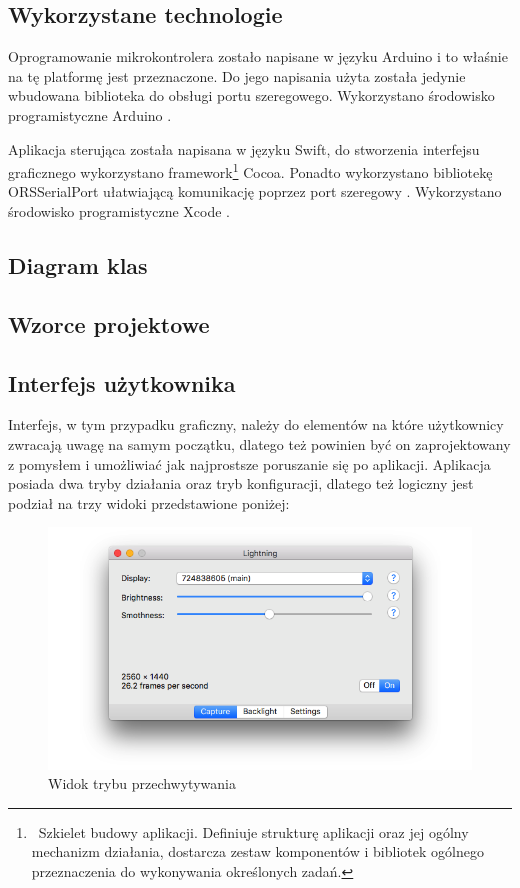 \documentclass[12pt]{report}
\begin{document}
\subsection{Wykorzystane technologie}

Oprogramowanie mikrokontrolera zostało napisane w języku Arduino i to właśnie na tę platformę jest przeznaczone. Do jego napisania użyta została jedynie wbudowana biblioteka do obsługi portu szeregowego. Wykorzystano środowisko programistyczne Arduino \cite{arduinoide}.

Aplikacja sterująca została napisana w języku Swift, do stworzenia interfejsu graficznego wykorzystano framework\footnote{~Szkielet budowy aplikacji. Definiuje strukturę aplikacji oraz jej ogólny mechanizm działania, dostarcza zestaw komponentów i bibliotek ogólnego przeznaczenia do wykonywania określonych zadań.} Cocoa. Ponadto wykorzystano bibliotekę\\ORSSerialPort ułatwiającą komunikację poprzez port szeregowy \cite{orsserialport}. Wykorzystano środowisko programistyczne Xcode \cite{xcode}.

\subsection{Diagram klas}


\subsection{Wzorce projektowe}


\subsection{Interfejs użytkownika}

Interfejs, w tym przypadku graficzny, należy do elementów na które użytkownicy zwracają uwagę na samym początku, dlatego też powinien być on zaprojektowany z pomysłem i umożliwiać jak najprostsze poruszanie się po aplikacji.
Aplikacja posiada dwa tryby działania oraz tryb konfiguracji, dlatego też logiczny jest podział na trzy widoki przedstawione poniżej:

\begin{figure}[h!]
\centering
\includegraphics[width=\textwidth]{../resources/capture.png}
\caption{Widok trybu przechwytywania}
\end{figure}
\end{document}
